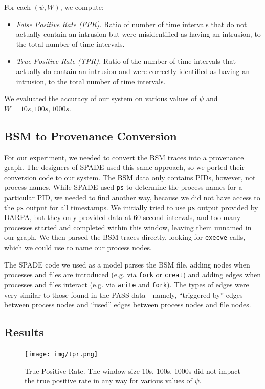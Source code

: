 \documentclass[10pt,twocolumn]{article}
\begin{document}
For each $(\psi, W)$, we compute:
\begin{itemize}
\item {\em False Positive Rate (FPR).} Ratio of number of time intervals that do not actually contain an intrusion
but were misidentified as having an intrusion, to the total number of time intervals.
\item {\em True Positive Rate (TPR).} Ratio of the number of time intervals that actually do contain an intrusion
and were correctly identified as having an intrusion, to the total number of time intervals.
\end{itemize}

We evaluated the accuracy of our system on various values of $\psi$ and $W = 10s, 100s, 1000s$.

\subsection{BSM to Provenance Conversion}
For our experiment, we needed to convert the BSM traces into a provenance graph. The designers of SPADE \cite{spade} used this same approach, so we ported their conversion code to our system. The BSM data only contains PIDs, however, not process names. While SPADE used \texttt{ps} to determine the process names for a particular PID, we needed to find another way, because we did not have access to the \texttt{ps} output for all timestamps. We initially tried to use \texttt{ps} output provided by DARPA, but they only provided data at 60 second intervals, and too many processes started and completed within this window, leaving them unnamed in our graph. We then parsed the BSM traces directly, looking for \texttt{execve} calls, which we could use to name our process nodes. 

The SPADE code we used as a model parses the BSM file, adding nodes when processes and files are introduced (e.g. via \texttt{fork} or \texttt{creat}) and adding edges when processes and files interact (e.g. via \texttt{write} and \texttt{fork}). The types of edges were very similar to those found in the PASS data - namely, ``triggered by'' edges between process nodes and ``used'' edges between process nodes and file nodes.
\subsection{Results}

\noindent
\begin{figure}
  \label{tpr}
  \centering
    \texttt{[image: img/tpr.png]}
    \caption{True Positive Rate. The window size 10s, 100s, 1000s did not impact the true positive rate in any way for various values of $\psi$.} 
\end{figure}
\end{document}

